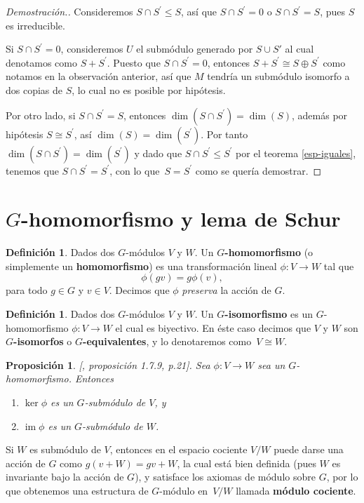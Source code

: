 \documentclass[12pt]{book}
\newtheorem{proposition}[theorem]{Proposición}
\theoremstyle{definition}
\newtheorem{definition}[theorem]{Definición}
\DeclareMathOperator{\im}{im}
\newcounter{in}
\newcounter{ini}
\begin{document}
\begin{proof}[Demostración.]
  Consideremos $S\cap S^{'}\leq S$, así que $S\cap S^{'}=0$ o $S\cap
  S^{'}=S$, pues $S$ es irreducible.

  Si $S\cap S^{'}=0$, consideremos $U$ el submódulo generado por $S\cup S'$ al cual
  denotamos como $S+S^{'}$. Puesto que $S\cap S^{'}=0$, entonces
  $S+S^{'}\cong S\oplus S^{'}$ como notamos en la observación anterior,
  así que $M$ tendría un submódulo isomorfo a dos copias de $S$, lo cual
  no es posible por hipótesis. 

  Por otro lado, si $S\cap S^{'}=S$, entonces $\dim (S\cap S^{'})=\dim(S)$, además por hipótesis $S\cong S^{'}$, así
  $\dim(S)=\dim(S^{'})$. Por tanto $\dim(S\cap S^{'})=\dim(S^{'})$ y
  dado que $S\cap S^{'}\leq S^{'}$ por el teorema \ref{esp-iguales}, tenemos
  que $S\cap S^{'}=S^{'}$, con lo que~$S=S^{'}$ como se quería
  demostrar.
\end{proof}

\section{$G$-homomorfismo y lema de Schur} 
\label{schur}

\begin{definition}
  Dados dos $G$-módulos $V$ y $W$. Un $G$\textbf{-homomorfismo} (o simplemente
  un \textbf{homomorfismo}) es una transformación lineal $\phi:V\rightarrow
  W$ tal que
  \begin{equation*}
    \phi(gv)=g\phi(v),
  \end{equation*}
para todo $g\in G$ y $v\in V$. Decimos que $\phi$ \emph{preserva} la acción
de $G$.
\end{definition}

\begin{definition}
  Dados dos $G$-módulos $V$ y $W$. Un $G$\textbf{-isomorfismo} es un
  $G$-homomorfismo $\phi:V\rightarrow W$ el cual es biyectivo. En
  éste caso decimos que $V$ y $W$ son $G$\textbf{-isomorfos} o
  $G$\textbf{-equivalentes}, y lo denotaremos como~$V\cong W$.
\end{definition}

\begin{proposition}{[\cite{sagan2001symmetric}, proposición 1.7.9, p.21]}.
  \label{ker-im-sub}
  Sea $\phi:V\rightarrow W$ sea un $G$-homomorfismo. Entonces
  \begin{enumerate}
  \item $\ker\phi$ es un $G$-submódulo de $V$, y
  \item $\im\phi$ es un $G$-submódulo de $W$.
  \end{enumerate}
\end{proposition}  
Si $W$ es submódulo de $V$, entonces en el espacio cociente
$V/W$ puede darse una acción de $G$ como $g(v+W)=gv+W$, la cual está
bien definida (pues $W$ es invariante bajo la acción de $G$), y
satisface los axiomas de módulo sobre $G$, por lo que obtenemos una
estructura de $G$-módulo en~$V/W$ llamada \textbf{módulo cociente}.
\end{document}

